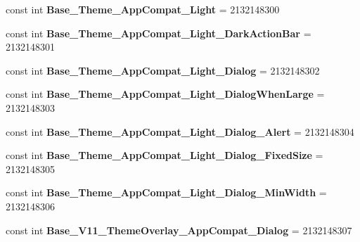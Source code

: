 \begin{DoxyCompactItemize}
const int {\bfseries Base\+\_\+\+Theme\+\_\+\+App\+Compat\+\_\+\+Light} = 2132148300
\item 
\mbox{\label{classst_delivery_1_1_resource_1_1_style_a6e3d580a9cde973394baeb90f1bda06b}} 
const int {\bfseries Base\+\_\+\+Theme\+\_\+\+App\+Compat\+\_\+\+Light\+\_\+\+Dark\+Action\+Bar} = 2132148301
\item 
\mbox{\label{classst_delivery_1_1_resource_1_1_style_a1d2bc7c47c12c0443889dfab85e4c65c}} 
const int {\bfseries Base\+\_\+\+Theme\+\_\+\+App\+Compat\+\_\+\+Light\+\_\+\+Dialog} = 2132148302
\item 
\mbox{\label{classst_delivery_1_1_resource_1_1_style_a345e9f8c8a7a3668acdae9034e043316}} 
const int {\bfseries Base\+\_\+\+Theme\+\_\+\+App\+Compat\+\_\+\+Light\+\_\+\+Dialog\+When\+Large} = 2132148303
\item 
\mbox{\label{classst_delivery_1_1_resource_1_1_style_a223b20e12a828e26d4862e2bac86c3cf}} 
const int {\bfseries Base\+\_\+\+Theme\+\_\+\+App\+Compat\+\_\+\+Light\+\_\+\+Dialog\+\_\+\+Alert} = 2132148304
\item 
\mbox{\label{classst_delivery_1_1_resource_1_1_style_aedb7a8f9a3388b8f7f8418ee046148d5}} 
const int {\bfseries Base\+\_\+\+Theme\+\_\+\+App\+Compat\+\_\+\+Light\+\_\+\+Dialog\+\_\+\+Fixed\+Size} = 2132148305
\item 
\mbox{\label{classst_delivery_1_1_resource_1_1_style_a53e7e7d075259e18b00df27cf1bbc1fb}} 
const int {\bfseries Base\+\_\+\+Theme\+\_\+\+App\+Compat\+\_\+\+Light\+\_\+\+Dialog\+\_\+\+Min\+Width} = 2132148306
\item 
\mbox{\label{classst_delivery_1_1_resource_1_1_style_aee56a923422c5b687d29a179a0738eec}} 
const int {\bfseries Base\+\_\+\+V11\+\_\+\+Theme\+Overlay\+\_\+\+App\+Compat\+\_\+\+Dialog} = 2132148307
\item 
\mbox{\label{classst_delivery_1_1_resource_1_1_style_a75c2ed9ac875b583c6d14a4c967455d0}} 

\end{DoxyCompactItemize}
